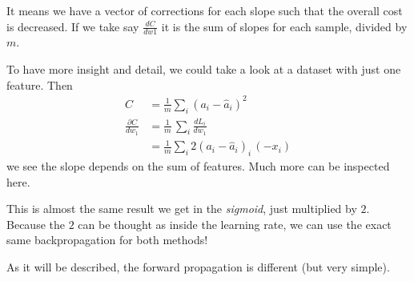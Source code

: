 It means we have a vector of corrections for each slope such that the overall cost is decreased. If we take say $\frac{dC}{dw1}$ it is the sum of slopes for each sample, divided by $m$. 

To have more insight and detail, we could take a look at a dataset with just one feature. Then 
\begin{align}
  C &= \frac{1}{m}\sum_i(a_i - \hat{a}_i)^2 \\ 
  \frac{\partial C}{dw_1}&= \frac{1}{m}\,\sum_i \frac{dL_i}{dw_1} \\
  &= \frac{1}{m}\sum_i 2(a_i - \hat{a}_i)_i\,(-x_i)
\end{align}
we see the slope depends on the sum of features. Much more can be inspected here.

This is almost the same result we get in the \textit{sigmoid}, just multiplied by $2$. Because the $2$ can be thought as inside the learning rate, we can use the exact same backpropagation for both methods!

As it will be described, the forward propagation is different (but very simple).
